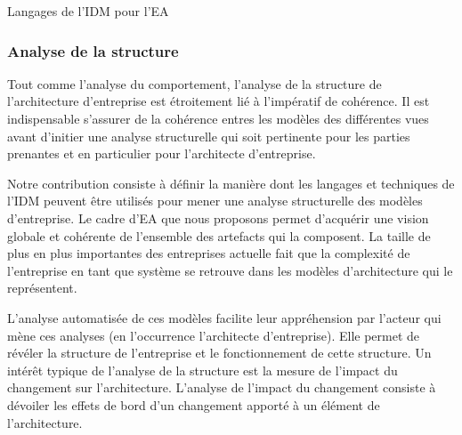 \begin{table}[!ht]
    \begin{center}
        
    \end{center}
    \caption{Langages de l'IDM pour l'EA}
    \label{fig:IDM_EA}
\end{table}

\subsubsection{Analyse de la structure}
Tout comme l'analyse du comportement, l'analyse de la structure de 
l'architecture d'entreprise est étroitement lié à l'impératif de cohérence.  Il 
est indispensable s'assurer de la cohérence entres les modèles des différentes 
vues avant d'initier une analyse structurelle qui soit pertinente pour les 
parties prenantes et en particulier pour l'architecte d'entreprise. 

Notre contribution consiste à définir la manière dont les langages et techniques 
de l'IDM peuvent être utilisés pour mener une analyse structurelle des modèles 
d'entreprise. Le cadre d'EA que nous proposons permet d'acquérir une vision 
globale et cohérente de l'ensemble des artefacts qui la composent. La taille de 
plus en plus importantes des entreprises actuelle fait que la complexité de 
l'entreprise en tant que système se retrouve dans les modèles d'architecture qui 
le représentent.

L'analyse automatisée de ces modèles facilite leur appréhension par l'acteur qui 
mène ces analyses (en l'occurrence l'architecte d'entreprise). Elle permet de 
révéler la structure de l'entreprise et le fonctionnement de cette structure. Un 
intérêt  typique de l'analyse de la structure est la mesure de l'impact du 
changement \cite{de2005change} sur l'architecture. L'analyse de l'impact du 
changement consiste à dévoiler les effets de bord d'un changement apporté à un 
élément de l'architecture.  

